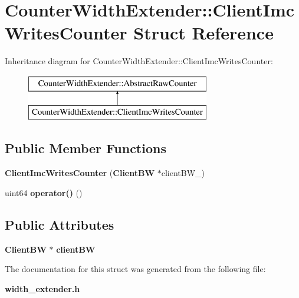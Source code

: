 \section{Counter\+Width\+Extender\+:\+:Client\+Imc\+Writes\+Counter Struct Reference}
\label{structCounterWidthExtender_1_1ClientImcWritesCounter}
Inheritance diagram for Counter\+Width\+Extender\+:\+:Client\+Imc\+Writes\+Counter\+:\begin{figure}[H]
\begin{center}
\leavevmode
\includegraphics[height=2.000000cm]{structCounterWidthExtender_1_1ClientImcWritesCounter}
\end{center}
\end{figure}
\subsection*{Public Member Functions}
\begin{DoxyCompactItemize}
\item 
{\bfseries Client\+Imc\+Writes\+Counter} ({\bf Client\+B\+W} $\ast$client\+B\+W\+\_\+)\label{structCounterWidthExtender_1_1ClientImcWritesCounter_ac68fa6d6b3e258c2118bbb7ec401fbdd}

\item 
uint64 {\bfseries operator()} ()\label{structCounterWidthExtender_1_1ClientImcWritesCounter_a3156907cb67016aea3255b75d7a887cb}

\end{DoxyCompactItemize}
\subsection*{Public Attributes}
\begin{DoxyCompactItemize}
\item 
{\bf Client\+B\+W} $\ast$ {\bfseries client\+B\+W}\label{structCounterWidthExtender_1_1ClientImcWritesCounter_a1235306f7c8d86c962c373a0bce23c3c}

\end{DoxyCompactItemize}


The documentation for this struct was generated from the following file\+:\begin{DoxyCompactItemize}
\item 
{\bf width\+\_\+extender.\+h}\end{DoxyCompactItemize}

